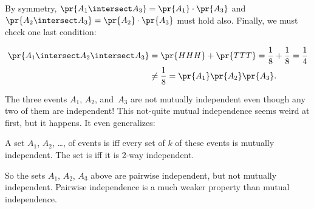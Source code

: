 \iffalse
\begin{align*}
\pr{A_1 \intersect A_2}
	& = \pr{HHH} + \pr{TTT} \\[2pt]
        & = \frac{1}{8} + \frac{1}{8} \\[2pt]
        & = \frac{1}{4} \\[2pt]
        & = \frac{1}{2} \cdot \frac{1}{2}\\[2pt]
        & = \pr{A_1} \pr{A_2}.
\end{align*}\fi

By symmetry, $\pr{A_1 \intersect A_3} = \pr{A_1} \cdot \pr{A_3}$ and
$\pr{A_2 \intersect A_3} = \pr{A_2} \cdot \pr{A_3}$ must hold also.
Finally, we must check one last condition:

\begin{align*}
\pr{A_1 \intersect A_2 \intersect A_3}
        & = \pr{HHH} + \pr{TTT}
          = \frac{1}{8} + \frac{1}{8}
          = \frac{1}{4}\\
        & \neq \frac{1}{8} = \pr{A_1} \pr{A_2} \pr{A_3}.
\end{align*}


\iffalse
\begin{align*}
\pr{A_1 \intersect A_2 \intersect A_3}      & = \pr{HHH} + \pr{TTT} \\[2pt]
                                & = \frac{1}{8} + \frac{1}{8} \\[2pt]
                                & = \frac{1}{4} \\[2pt]
                                & \neq \pr{A_1} \pr{A_2} \pr{A_3} = \frac{1}{8}.
\end{align*}
\fi
%
The three events $A_1$, $A_2$, and~$A_3$ are not mutually independent
even though any two of them are independent!  This not-quite mutual
independence seems weird at first, but it happens.  It even
generalizes:

\begin{definition}\label{kway_independent_events}
  A set $A_1$, $A_2$, \dots, of events is 
  iff every set of $k$ of these events is mutually independent.  The
  set is  iff it is 2-way independent.
\end{definition}

So the sets $A_1$, $A_2$, $A_3$ above are pairwise independent, but
not mutually independent.  Pairwise independence is a much weaker
property than mutual independence.

